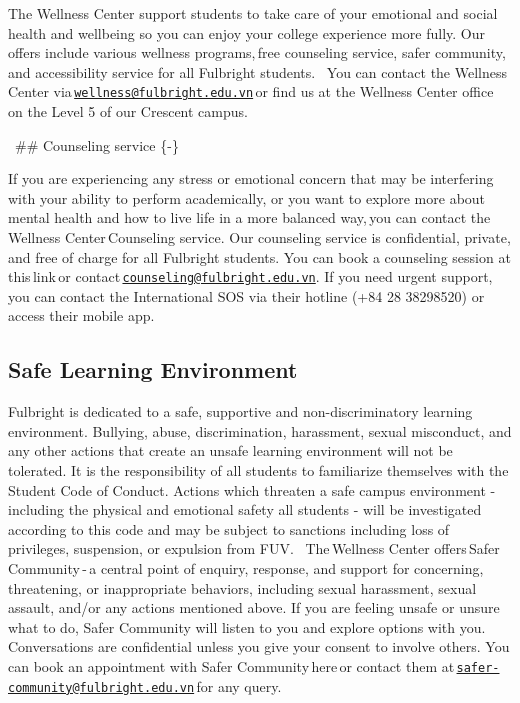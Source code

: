 \documentclass[
]{article}
\begin{document}
The Wellness Center support students to take care of your emotional and social health and wellbeing so you can enjoy your college experience more fully. Our offers include various wellness programs,\,free counseling service, safer community, and accessibility service for all Fulbright students.
\,
You can contact the Wellness Center via\,\href{mailto:wellness@fulbright.edu.vn}{\nolinkurl{wellness@fulbright.edu.vn}}\,or find us at the Wellness Center office on the Level 5 of our Crescent campus.

\,
\#\# Counseling service \{-\}

If you are experiencing any stress or emotional concern that may be interfering with your ability to perform academically, or you want to explore more about mental health and how to live life in a more balanced way,\,you can contact the Wellness Center\,Counseling service.
Our counseling service is confidential, private, and free of charge for all Fulbright students. You can book a counseling session at this\,link\,or contact\,\href{mailto:counseling@fulbright.edu.vn}{\nolinkurl{counseling@fulbright.edu.vn}}. If you need urgent support, you can contact the International SOS via their hotline (+84 28 38298520) or access their mobile app.

\hypertarget{safe-learning-environment}{%
\subsection*{Safe Learning Environment\,}\label{safe-learning-environment}}

Fulbright is dedicated to a safe, supportive and non-discriminatory learning environment. Bullying, abuse, discrimination, harassment, sexual misconduct, and any other actions that create an unsafe learning environment will not be tolerated. It is the responsibility of all students to familiarize themselves with the\,Student Code of Conduct. Actions which threaten a safe campus environment - including the physical and emotional safety all students - will be investigated according to this code and may be subject to sanctions including loss of privileges, suspension, or expulsion from FUV.
\,
The\,Wellness Center offers\,Safer Community\,-\,a central point of enquiry, response, and support for concerning, threatening, or inappropriate behaviors, including sexual harassment, sexual assault, and/or any actions mentioned above. If you are feeling unsafe or unsure what to do, Safer Community will listen to you and explore options with you. Conversations are confidential unless you give your consent to involve others. You can book an appointment with Safer Community\,here\,or contact them at\,\href{mailto:safer-community@fulbright.edu.vn}{\nolinkurl{safer-community@fulbright.edu.vn}}\,for any query.
\end{document}
